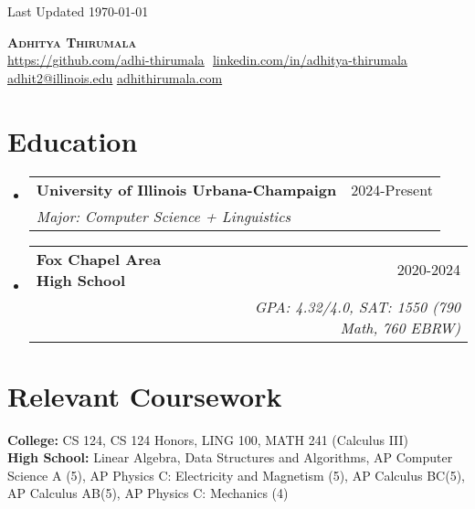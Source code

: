 \documentclass{article}
\makeatletter
\newcommand{\resumeSubheading}[4]{
  \vspace{-2pt}\item
    \begin{tabular*}{0.97\textwidth}[t]{l@{\extracolsep{\fill}}r}
      \textbf{#1} & #2 \\
      \textit{\small#3} & \textit{\small #4} \\
    \end{tabular*}\vspace{-7pt}
}
\newcommand{\resumeSubHeadingListStart}{\begin{itemize}[leftmargin=0.15in, label={}]}
\newcommand{\resumeSubHeadingListEnd}{\end{itemize}}
\makeatother
\begin{document}
\begin{flushright}
  \vspace{-4pt}
  \color{gray}
  \item
  Last Updated \today
\end{flushright}

\vspace{-7pt}

\begin{center}
    \textbf{\Huge \scshape Adhitya Thirumala} \\ \vspace{8pt}
    \small 
    \href{https://github.com/adhi-thirumala}{\underline{https://github.com/adhi-thirumala}} $  $
    \href{www.linkedin.com/in/adhitya-thirumala}
    {\underline{linkedin.com/in/adhitya-thirumala}} $  $
    \href{mailto:adhit2@illinois.edu}
    {\underline{adhit2@illinois.edu}}
    \href{https://www.adhithirumala.com}
    {\underline{adhithirumala.com}} $  $


\end{center}

\section{Education}
  \resumeSubHeadingListStart

    \resumeSubheading{University of Illinois Urbana-Champaign} {2024-Present} {Major: Computer Science + Linguistics}{}
    \resumeSubheading
      {Fox Chapel Area High School}{2020-2024}
      {}{GPA: 4.32/4.0, SAT: 1550 (790 Math, 760 EBRW)}
      \resumeSubHeadingListEnd
\vspace{-10pt}
    \section{Relevant Coursework}
    \begin{itemize}[leftmargin=0.15in, label={}]
    \small{\item{
       \textbf{College:}{ CS 124, CS 124 Honors, LING 100, MATH 241 (Calculus III)}\\
     \textbf{High School:}{ Linear Algebra, Data Structures and Algorithms, AP Computer Science A (5), AP Physics C: Electricity and Magnetism (5), AP Calculus BC(5), AP Calculus AB(5), AP Physics C: Mechanics (4)} \\
     
    }}
 \end{itemize}
\end{document}
